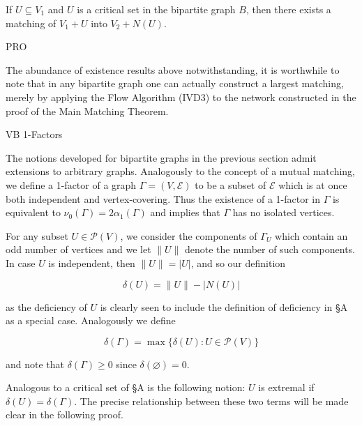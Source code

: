 If $U \subseteq V_1$ and $U$ is a critical set in the bipartite graph $B$, then there exists a matching of $V_1 + U$ into $V_2 + N(U)$.

PRO

The abundance of existence results above notwithstanding, it is worthwhile to note that in any bipartite graph one can actually construct a largest matching, merely by applying the Flow Algorithm (IVD3) to the network constructed in the proof of the Main Matching Theorem.

VB 1-Factors

The notions developed for bipartite graphs in the previous section admit extensions to arbitrary graphs. Analogously to the concept of a mutual matching, we define a 1-factor of a graph $\Gamma = (V, \mathcal{E})$ to be a subset of $\mathcal{E}$ which is at once both independent and vertex-covering. Thus the existence of a 1-factor in $\Gamma$ is equivalent to $\nu_0(\Gamma) = 2\alpha_1(\Gamma)$ and implies that $\Gamma$ has no isolated vertices.

For any subset $U \in \mathcal{P}(V)$, we consider the components of $\Gamma_U$ which contain an odd number of vertices and we let $\|U\|$ denote the number of such components. In case $U$ is independent, then $\|U\| = |U|$, and so our definition

$$\delta(U) = \|U\| - |N(U)|$$

as the deficiency of $U$ is clearly seen to include the definition of deficiency in §A as a special case. Analogously we define

$$\delta(\Gamma) = \max\{\delta(U): U \in \mathcal{P}(V)\}$$

and note that $\delta(\Gamma) \geq 0$ since $\delta(\varnothing) = 0$.

Analogous to a critical set of §A is the following notion: $U$ is extremal if $\delta(U) = \delta(\Gamma)$. The precise relationship between these two terms will be made clear in the following proof.
